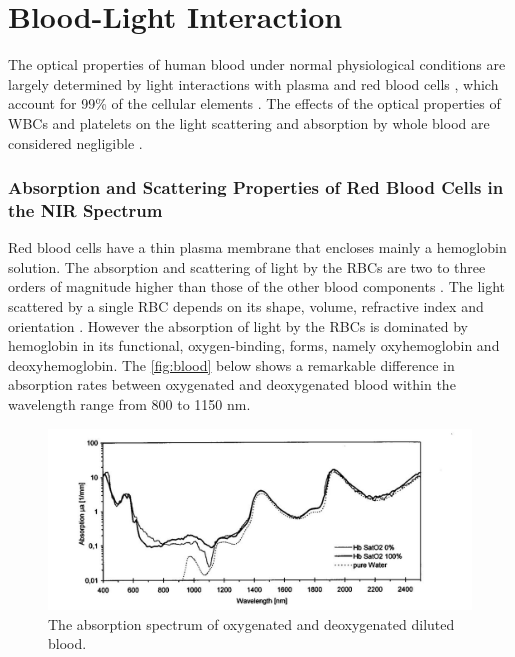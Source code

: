 \section{Blood-Light Interaction}


The optical properties of human blood under normal physiological conditions are largely determined by light interactions with plasma and red blood cells \parencite{opticsOfBlood}, which account for 99\% of the cellular elements \parencite{opticsOfBlood1}. 
The effects of the optical properties of WBCs and platelets on the light scattering and absorption by whole blood are considered negligible \parencite{opticsOfBlood}.

\subsubsection{Absorption and Scattering Properties of Red Blood Cells in the NIR Spectrum}
Red blood cells have a thin plasma membrane that encloses mainly a hemoglobin solution. The absorption and scattering of light by the RBCs are two to three orders of magnitude higher than those of the other blood components \parencite{opticsOfBlood1}. The light scattered by a single RBC depends on
its shape, volume, refractive index and orientation \parencite{opticsOfBlood1}. However the absorption of light by the RBCs is dominated by hemoglobin in its functional, oxygen-binding, forms, namely oxyhemoglobin and deoxyhemoglobin. 
The  \autoref{fig:blood} below shows a remarkable difference in absorption rates between oxygenated and deoxygenated blood within the wavelength range from 800 to 1150 nm.


\begin{figure}[H]
\centering
\includegraphics[scale=0.5]{figures/blood.JPG}
\caption[The absorption spectrum of oxygenated and deoxygenated diluted blood]{The absorption spectrum of oxygenated and deoxygenated diluted blood.}\label{fig:blood}
\end{figure}

